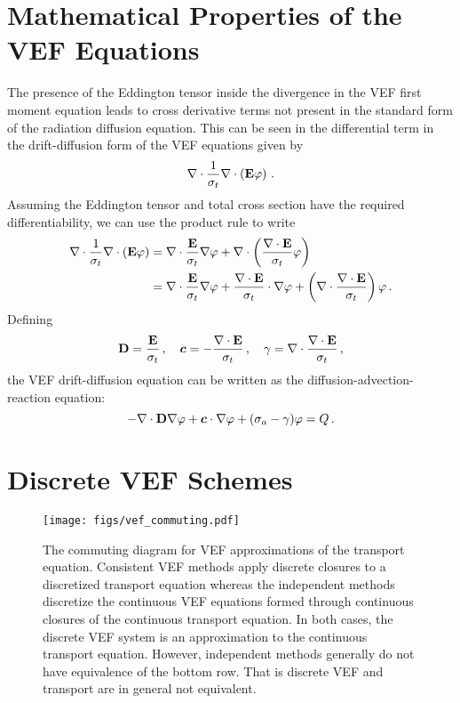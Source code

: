 \documentclass[../doc.tex]{subfiles}
\begin{document}
\section{Mathematical Properties of the VEF Equations}
The presence of the Eddington tensor inside the divergence in the VEF first moment equation leads to cross derivative terms not present in the standard form of the radiation diffusion equation. This can be seen in the differential term in the drift-diffusion form of the VEF equations given by
	\begin{equation}
		\nabla\cdot\frac{1}{\sigma_t}\nabla\cdot\left( \boldsymbol{\mathrm{E}}\varphi \right) \,. 
	\end{equation}
Assuming the Eddington tensor and total cross section have the required differentiability, we can use the product rule to write 
	\begin{equation}
	\begin{aligned}
		\nabla\cdot\frac{1}{\sigma_t}\nabla\cdot\left( \boldsymbol{\mathrm{E}}\varphi \right) &= \nabla\cdot\frac{\boldsymbol{\mathrm{E}}}{\sigma_t}\nabla\varphi + \nabla\cdot\left( \frac{\nabla\cdot\boldsymbol{\mathrm{E}}}{\sigma_t}\varphi \right) \\
		&= \nabla\cdot\frac{\boldsymbol{\mathrm{E}}}{\sigma_t}\nabla\varphi + \frac{\nabla\cdot\boldsymbol{\mathrm{E}}}{\sigma_t}\cdot\nabla\varphi + \left( \nabla\cdot\frac{\nabla\cdot\boldsymbol{\mathrm{E}}}{\sigma_t} \right) \varphi \,. 
	\end{aligned}
	\end{equation}
Defining 
	\begin{equation}
		\boldsymbol{\mathrm{D}} = \frac{\boldsymbol{\mathrm{E}}}{\sigma_t}\,,\quad \boldsymbol{c} = -\frac{\nabla\cdot\boldsymbol{\mathrm{E}}}{\sigma_t}\,, \quad \gamma = \nabla\cdot\frac{\nabla\cdot\boldsymbol{\mathrm{E}}}{\sigma_t} \,,
	\end{equation}
the VEF drift-diffusion equation can be written as the diffusion-advection-reaction equation: 
	\begin{equation}
		-\nabla\cdot\boldsymbol{\mathrm{D}}\nabla\varphi + \boldsymbol{c}\cdot\nabla\varphi + (\sigma_a - \gamma) \varphi = Q \,. 
	\end{equation}

\section{Discrete VEF Schemes}
\begin{figure}
\centering
\texttt{[image: figs/vef\_commuting.pdf]}
\caption{The commuting diagram for VEF approximations of the transport equation. Consistent VEF methods apply discrete closures to a discretized transport equation whereas the independent methods discretize the continuous VEF equations formed through continuous closures of the continuous transport equation. In both cases, the discrete VEF system is an approximation to the continuous transport equation. However, independent methods generally do not have equivalence of the bottom row. That is discrete VEF and transport are in general not equivalent.}
\label{vef:commuting}
\end{figure}
\end{document}

